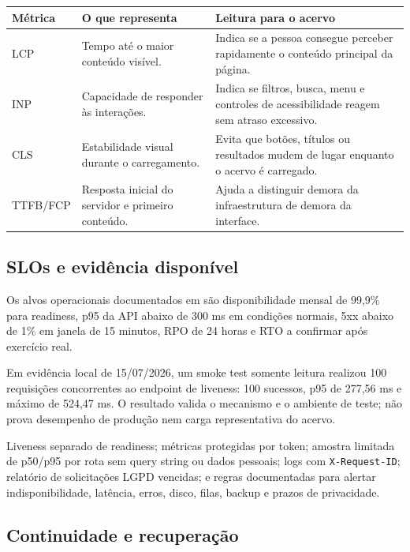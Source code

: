 \documentclass[11pt,a4paper]{article}
\newcommand{\internal}[1]{\path{#1}}
\newcommand{\code}[1]{\texttt{#1}}
\begin{document}
\begin{longtable}{P{0.18\textwidth}P{0.30\textwidth}P{0.38\textwidth}}
\toprule
\textbf{Métrica} & \textbf{O que representa} & \textbf{Leitura para o acervo} \\
\midrule
\endhead
\bottomrule
\endfoot
LCP & Tempo até o maior conteúdo visível. & Indica se a pessoa consegue perceber rapidamente o conteúdo principal da página. \\
INP & Capacidade de responder às interações. & Indica se filtros, busca, menu e controles de acessibilidade reagem sem atraso excessivo. \\
CLS & Estabilidade visual durante o carregamento. & Evita que botões, títulos ou resultados mudem de lugar enquanto o acervo é carregado. \\
TTFB/FCP & Resposta inicial do servidor e primeiro conteúdo. & Ajuda a distinguir demora da infraestrutura de demora da interface. \\
\end{longtable}

\subsection{SLOs e evidência disponível}

Os alvos operacionais documentados em \internal{docs/observability-and-slo.md} são disponibilidade mensal de 99,9\% para readiness, p95 da API abaixo de 300 ms em condições normais, 5xx abaixo de 1\% em janela de 15 minutos, RPO de 24 horas e RTO a confirmar após exercício real.

Em evidência local de 15/07/2026, um smoke test somente leitura realizou 100 requisições concorrentes ao endpoint de liveness: 100 sucessos, p95 de 277,56 ms e máximo de 524,47 ms. O resultado valida o mecanismo e o ambiente de teste; não prova desempenho de produção nem carga representativa do acervo.

\begin{evidencebox}[title=Observabilidade disponível no próprio sistema]
Liveness separado de readiness; métricas protegidas por token; amostra limitada de p50/p95 por rota sem query string ou dados pessoais; logs com \code{X-Request-ID}; relatório de solicitações LGPD vencidas; e regras documentadas para alertar indisponibilidade, latência, erros, disco, filas, backup e prazos de privacidade.
\end{evidencebox}

\subsection{Continuidade e recuperação}
\end{document}
